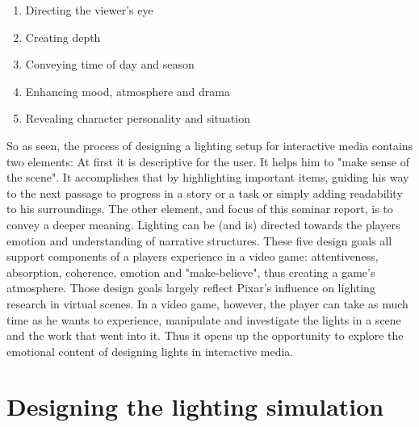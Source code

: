 \begin{enumerate}
    \item Directing the viewer's eye
    \item Creating depth
    \item Conveying time of day and season
    \item Enhancing mood, atmosphere and drama
    \item Revealing character personality and situation
\end{enumerate}
\newpage
So as seen, the process of designing a lighting setup for interactive media contains two elements: At first it is descriptive for the user. It helps him to "make sense of the scene". It accomplishes that by highlighting important items, guiding his way to the next passage to progress in a story or a task or simply adding readability to his surroundings. 
The other element, and focus of this seminar report, is to convey a deeper meaning. Lighting can be (and is) directed towards the players emotion and understanding of narrative structures. These five design goals all support components of a players experience in a video game: attentiveness, absorption,
coherence, emotion and "make-believe",\cite{Niedenthal1404353} thus creating a game's atmosphere. 
Those design goals largely reflect Pixar's influence on lighting research in virtual scenes. In a video game, however, the player can take as much time as he wants to experience, manipulate and investigate the lights in a scene and the work that went into it\cite{Maggi.2006}. Thus it opens up the opportunity to explore the emotional content of designing lights in interactive media. 

\section{Designing the lighting simulation}
